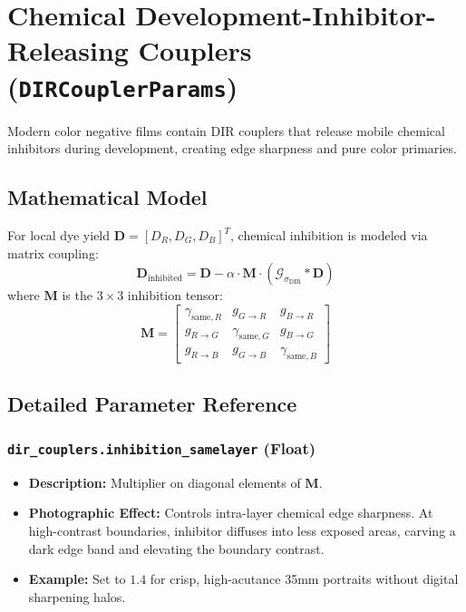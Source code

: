 \documentclass[11pt,a4paper]{article}
\begin{document}
\newpage

\section{Chemical Development-Inhibitor-Releasing Couplers (\texttt{DIRCouplerParams})}

Modern color negative films contain DIR couplers that release mobile chemical inhibitors during development, creating edge sharpness and pure color primaries.

\subsection{Mathematical Model}
For local dye yield $\mathbf{D} = [D_R, D_G, D_B]^T$, chemical inhibition is modeled via matrix coupling:
\begin{equation}
\mathbf{D}_{\text{inhibited}} = \mathbf{D} - \alpha \cdot \mathbf{M} \cdot (\mathcal{G}_{\sigma_{\text{DIR}}} * \mathbf{D})
\end{equation}
where $\mathbf{M}$ is the $3 \times 3$ inhibition tensor:
\begin{equation}
\mathbf{M} = \begin{bmatrix}
\gamma_{\text{same}, R} & g_{G \to R} & g_{B \to R} \\
g_{R \to G} & \gamma_{\text{same}, G} & g_{B \to G} \\
g_{R \to B} & g_{G \to B} & \gamma_{\text{same}, B}
\end{bmatrix}
\end{equation}

\subsection{Detailed Parameter Reference}

\subsubsection{\texttt{dir\_couplers.inhibition\_samelayer} (Float)}
\begin{itemize}[leftmargin=*]
    \item \textbf{Description:} Multiplier on diagonal elements of $\mathbf{M}$.
    \item \textbf{Photographic Effect:} Controls intra-layer chemical edge sharpness. At high-contrast boundaries, inhibitor diffuses into less exposed areas, carving a dark edge band and elevating the boundary contrast.
    \item \textbf{Example:} Set to $1.4$ for crisp, high-acutance 35mm portraits without digital sharpening halos.
\end{itemize}
\end{document}
